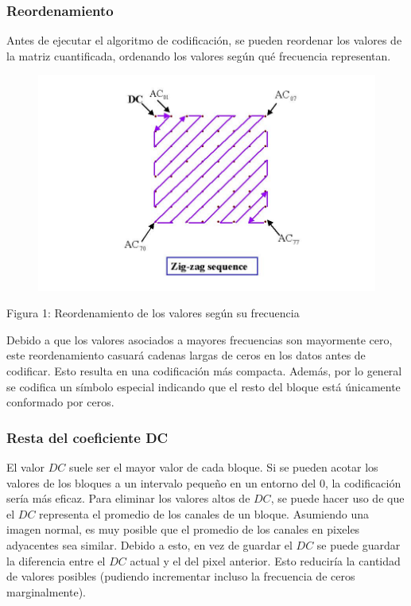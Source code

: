 \documentclass[%
final,
%
reprint,
%
notitlepage,
narroweqnarray,
inline,
twoside,
invited
]{ieee}
\begin{document}
\subsubsection{Reordenamiento}

\par Antes de ejecutar el algoritmo de codificación, se pueden reordenar los valores de la matriz cuantificada, 
ordenando los valores según qué frecuencia representan. 

\begin{figure}[H]
	\includegraphics[scale=0.5]{./img/zig-zag.jpg}
\end{figure}
\begin{center}
\par Figura 1: Reordenamiento de los valores según su frecuencia
\end{center}

\par Debido a que los valores asociados a mayores frecuencias son mayormente cero, este reordenamiento casuará 
cadenas largas de ceros en los datos antes de codificar. Esto resulta en una codificación más compacta. Además, 
por lo general se codifica un símbolo especial indicando que el resto del bloque está únicamente conformado 
por ceros.

\subsubsection{Resta del coeficiente DC}

El valor $DC$ suele ser el mayor valor de cada bloque. Si se pueden acotar los valores de los bloques a un intervalo 
pequeño en un entorno del 0, la codificación sería más eficaz. Para eliminar los valores altos de $DC$, se puede hacer 
uso de que el $DC$ representa el promedio de los canales de un bloque. Asumiendo una imagen normal, es muy posible 
que el promedio de los canales en pixeles adyacentes sea similar. Debido a esto, en vez de guardar el $DC$ se puede 
guardar la diferencia entre el $DC$ actual y el del pixel anterior. Esto reduciría la cantidad de valores 
posibles (pudiendo incrementar incluso la frecuencia de ceros marginalmente).
\end{document}
